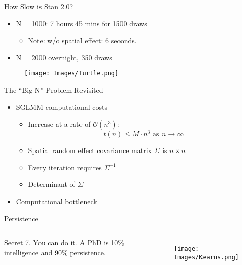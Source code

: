 \documentclass{beamer}
\begin{document}
\begin{frame}{How Slow is Stan 2.0?}

\begin{itemize}
\addtolength{\itemsep}{0.5\baselineskip}
\item N = 1000: 7 hours 45 mins for 1500 draws
  \begin{itemize}
  \item Note: w/o spatial effect: 6 seconds.
  \end{itemize}
\item N = 2000 overnight, 350 draws
\end{itemize}
  \begin{figure}[H]
	\centering
	\texttt{[image: Images/Turtle.png]}
	\end{figure}

\end{frame}

\begin{frame}{The ``Big N'' Problem Revisited}
\begin{itemize}
\addtolength{\itemsep}{0.5\baselineskip}
  \item SGLMM computational costs
  \begin{itemize}
  \addtolength{\itemsep}{0.5\baselineskip}
  \item Increase at a rate of $\mathcal{O}(n^{3})$: 
  $$t(n) \leq M \cdot n^{3} \text{ as } n \rightarrow \infty$$   
  \item Spatial random effect covariance matrix $\Sigma$ is $n \times n$
  \item Every iteration requires $\Sigma^{-1}$
  \item Determinant of $\Sigma$
  \end{itemize}
\item Computational bottleneck
\end{itemize}
\end{frame}

\begin{frame}{Persistence}

\begin{columns}


\begin{center}
\Large Secret 7. You can do it. A PhD is 10\% intelligence and 90\%
persistence.
\end{center}

  \begin{figure}[H]
	\centering
	\texttt{[image: Images/Kearns.png]}
	\end{figure}

\end{columns}
\end{frame}
\end{document}
